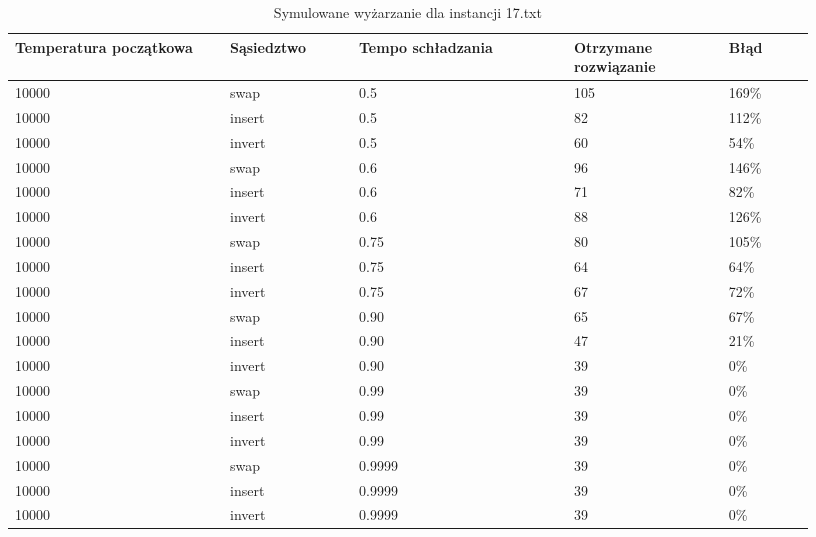 \documentclass[12pt,a4paper,titlepage]{article}
\begin{document}
\begin{table}[H]
    \centering
	{\begin{tabular}{|p{0.25\linewidth}p{0.15\linewidth}p{0.25\linewidth}p{0.18\linewidth}p{0.1\linewidth}|}
		\hline
        Temperatura początkowa & Sąsiedztwo & Tempo schładzania & Otrzymane rozwiązanie & Błąd \\
		\hline
        10000 & swap&0.5 & 105 & 169\% \\
        10000 & insert&0.5 & 82 & 112\% \\
        10000 & invert&0.5 & 60 & 54\% \\
        \hline
        10000 &swap& 0.6 & 96 & 146\% \\
        10000 &insert& 0.6 & 71 & 82\% \\
        10000 &invert& 0.6 & 88 & 126\% \\
        \hline
        10000 &swap& 0.75 & 80 & 105\% \\
        10000 &insert& 0.75 & 64 & 64\% \\
        10000 &invert& 0.75 & 67 & 72\% \\
        \hline
        10000 &swap& 0.90 & 65 & 67\% \\
        10000 &insert& 0.90 & 47 & 21\% \\
        10000 &invert& 0.90 & 39 & 0\% \\
        \hline
        10000 &swap& 0.99 & 39 & 0\% \\
        10000 &insert& 0.99 & 39 & 0\% \\
        10000 &invert& 0.99 & 39 & 0\% \\
        \hline
        10000 &swap& 0.9999 & 39 & 0\% \\
        10000 &insert& 0.9999 & 39 & 0\% \\
        10000 &invert& 0.9999 & 39 & 0\% \\
        \hline
	\end{tabular}}
	\caption{Symulowane wyżarzanie dla instancji 17.txt}
\end{table}
\end{document}
